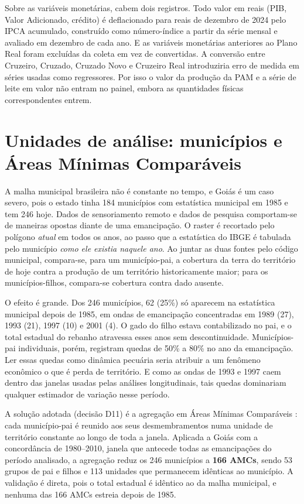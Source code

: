 Sobre as variáveis monetárias, cabem dois registros. Todo valor em reais (PIB,
Valor Adicionado, crédito) é deflacionado para reais de dezembro de 2024 pelo
IPCA acumulado, construído como número-índice a partir da série mensal e
avaliado em dezembro de cada ano. E as variáveis monetárias anteriores ao
Plano Real foram excluídas da coleta em vez de convertidas. A conversão entre
Cruzeiro, Cruzado, Cruzado Novo e Cruzeiro Real introduziria erro de medida em
séries usadas como regressores. Por isso o valor da produção da PAM e a série
de leite em valor não entram no painel, embora as quantidades físicas
correspondentes entrem.

\section{Unidades de análise: municípios e Áreas Mínimas Comparáveis}
\label{sec:met-amc}

A malha municipal brasileira não é constante no tempo, e Goiás é um caso
severo, pois o estado tinha 184 municípios com estatística municipal em 1985 e tem
246 hoje. Dados de sensoriamento remoto e dados de pesquisa comportam-se de
maneiras opostas diante de uma emancipação. O raster é recortado pelo polígono
\emph{atual} em todos os anos, ao passo que a estatística do IBGE é tabulada
pelo município \emph{como ele existia naquele ano}. Ao juntar as duas fontes
pelo código municipal, compara-se, para um município-pai, a cobertura da terra
do território de hoje contra a produção de um território historicamente maior;
para os municípios-filhos, compara-se cobertura contra dado ausente.

O efeito é grande. Dos 246 municípios, 62 (25\%) só aparecem na estatística
municipal depois de 1985, em ondas de emancipação concentradas em 1989 (27),
1993 (21), 1997 (10) e 2001 (4). O gado do filho estava contabilizado no pai,
e o total estadual do rebanho atravessa esses anos sem descontinuidade.
Municípios-pai individuais, porém, registram quedas de 50\% a 80\% no ano da
emancipação. Ler essas quedas como dinâmica pecuária seria atribuir a um
fenômeno econômico o que é perda de território. E como as ondas de 1993 e 1997
caem dentro das janelas usadas pelas análises longitudinais, tais quedas
dominariam qualquer estimador de variação nesse período.

A solução adotada (decisão D11) é a agregação em Áreas Mínimas Comparáveis
\cite{Ehrl2017}: cada município-pai é reunido aos seus desmembramentos numa
unidade de território constante ao longo de toda a janela. Aplicada a Goiás
com a concordância de 1980--2010, janela que antecede todas as emancipações do
período analisado, a agregação reduz os 246 municípios a \textbf{166 AMCs},
sendo 53 grupos de pai e filhos e 113 unidades que permanecem idênticas ao
município. A validação é direta, pois o total estadual é idêntico ao da malha
municipal, e nenhuma das 166 AMCs estreia depois de 1985.

